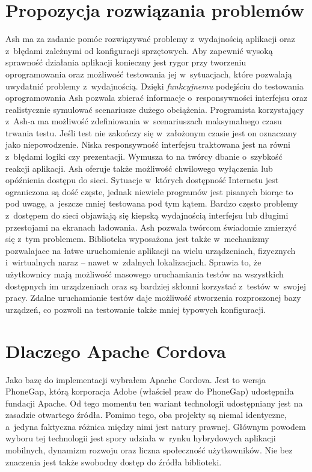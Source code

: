 \documentclass[brudnopis]{xmgr}
\begin{document}
\section{Propozycja rozwiązania problemów}
Ash ma za zadanie pomóc rozwiązywać problemy z~wydajnością aplikacji oraz z~błędami zależnymi od konfiguracji sprzętowych. Aby
zapewnić wysoką sprawność działania aplikacji konieczny jest rygor przy tworzeniu
oprogramowania oraz możliwość testowania jej w~sytuacjach, które pozwalają
uwydatnić problemy z~wydajnością. Dzięki \textit{funkcyjnemu} podejściu do testowania
oprogramowania Ash pozwala zbierać informacje o~responsywności interfejsu
oraz realistycznie symulować scenariusze dużego obciążenia. Programista
korzystający z~Ash-a ma możliwość zdefiniowania w~scenariuszach maksymalnego
czasu trwania testu. Jeśli test nie zakończy się w~założonym czasie jest on oznaczany jako niepowodzenie. Niska responsywność interfejsu traktowana jest na równi z~błędami
logiki czy prezentacji. Wymusza to na twórcy dbanie o~szybkość reakcji aplikacji.
Ash oferuje także możliwość chwilowego wyłączenia lub opóźnienia dostępu do
sieci. Sytuacje w~których dostępność Internetu jest ograniczona są dość częste,
jednak niewiele programów jest pisanych biorąc to pod uwagę, a~jeszcze mniej 
testowana pod tym kątem. Bardzo często problemy z~dostępem do sieci objawiają się kiepską
wydajnością interfejsu lub długimi przestojami na ekranach ładowania. Ash pozwala
twórcom świadomie zmierzyć się z~tym problemem. Biblioteka wyposażona jest także w~mechanizmy pozwalajace na łatwe uruchomienie aplikacji na wielu urządzeniach, fizycznych i~wirtualnych naraz -- nawet w~zdalnych lokalizacjach. Sprawia to, że
użytkownicy mają możliwość masowego uruchamiania testów na wszystkich
dostępnych im urządzeniach oraz są bardziej skłonni korzystać z~testów w~swojej pracy. Zdalne uruchamianie testów daje możliwość stworzenia
rozproszonej bazy urządzeń, co pozwoli na testowanie także mniej typowych
konfiguracji.

\section{Dlaczego Apache Cordova}
Jako bazę do implementacji wybrałem Apache Cordova. Jest to
wersja PhoneGap, którą korporacja Adobe (właściel praw do PhoneGap) udostępniła
fundacji Apache. Od tego momentu ten wariant technologii udostępniany jest
na zasadzie otwartego źródła. Pomimo tego, oba projekty są niemal identyczne, a~jedyna faktyczna różnica między nimi jest natury prawnej. Głównym powodem
wyboru tej technologii jest spory udziała w~rynku hybrydowych aplikacji mobilnych,
dynamizm rozwoju oraz liczna społeczność użytkowników. Nie bez znaczenia jest także swobodny dostęp do źródła biblioteki.
\end{document}

